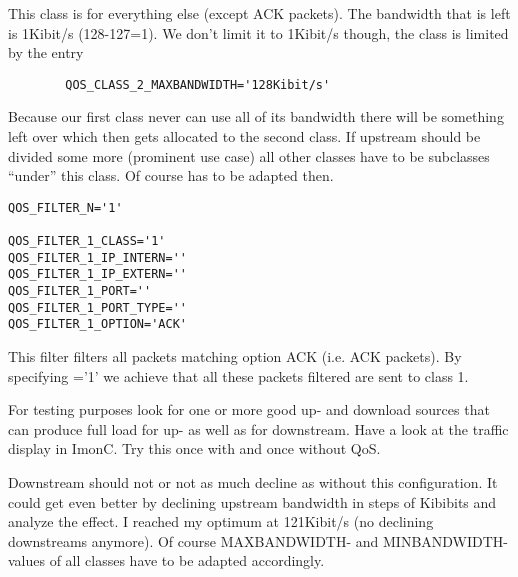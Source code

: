    This class is for everything else (except ACK packets). The bandwidth
   that is left is 1Kibit/s (128-127=1). We don't limit it to 1Kibit/s though,
   the class is limited by the entry
\begin{example}
\begin{verbatim}
        QOS_CLASS_2_MAXBANDWIDTH='128Kibit/s'
\end{verbatim}
\end{example}

   Because our first class never can use all of its bandwidth there will be
   something left over which then gets allocated to the second class. If upstream
   should be divided some more (prominent use case) all other classes have to
   be subclasses ``under'' this class.  Of course 
   has to be adapted then.

\begin{small}
\begin{example}
\begin{verbatim}
QOS_FILTER_N='1'

QOS_FILTER_1_CLASS='1'
QOS_FILTER_1_IP_INTERN=''
QOS_FILTER_1_IP_EXTERN=''
QOS_FILTER_1_PORT=''
QOS_FILTER_1_PORT_TYPE=''
QOS_FILTER_1_OPTION='ACK'
\end{verbatim}
\end{example}
\end{small}

   This filter filters all packets matching option ACK (i.e. ACK packets).
   By specifying ='1' we achieve that
   all these packets filtered are sent to class 1.

   For testing purposes look for one or more good up- and download sources
   that can produce full load for up- as well as for downstream. Have a
   look at the traffic display in ImonC. Try this once with and once without
   QoS.

   Downstream should not or not as much decline as without this configuration.
   It could get even better by declining upstream bandwidth in steps of Kibibits
   and analyze the effect. I reached my optimum at 121Kibit/s (no declining
   downstreams anymore). Of course MAXBANDWIDTH- and MINBANDWIDTH- values
   of all classes have to be adapted accordingly.

